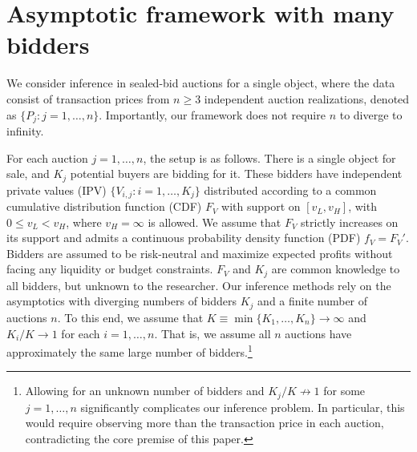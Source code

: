 


\section{Asymptotic framework with many bidders}\label{sec:setup}

We consider inference in sealed-bid auctions for a single object, where the data consist of transaction prices from $n \geq 3$ independent auction realizations, denoted as $\{P_j:j=1,\dots,n\}$. Importantly, our framework does not require $n$ to diverge to infinity.

For each auction $j=1,\dots,n$, the setup is as follows. There is a single object for sale, and $K_j$ potential buyers are bidding for it. These bidders have independent private values (IPV) $\{V_{i,j}:i=1,\dots,K_j\}$ distributed according to a common cumulative distribution function (CDF) $F_V$ with support on $[v_L,v_H]$, with $0\leq v_L<v_H$, where $v_H=\infty$ is allowed.
We assume that $F_V$ strictly increases on its support and admits a continuous probability density function (PDF) $f_V=F_V'$. Bidders are assumed to be risk-neutral and maximize expected profits without facing any liquidity or budget constraints. $F_V$ and $K_j$ are common knowledge to all bidders, but unknown to the researcher. Our inference methods rely on the asymptotics with diverging numbers of bidders $K_j$ and a finite number of auctions $n$. To this end, we assume that $K \equiv \min\{K_1,\dots,K_n\} \to \infty$ and $K_i/K \to 1$ for each $i=1,\dots,n$.
That is, we assume all $n$ auctions have approximately the same large number of bidders.\footnote{Allowing for an unknown number of bidders and $K_j/K \not\to 1$ for some $j=1,\dots,n$ significantly complicates our inference problem. In particular, this would require observing more than the transaction price in each auction, contradicting the core premise of this paper.}

